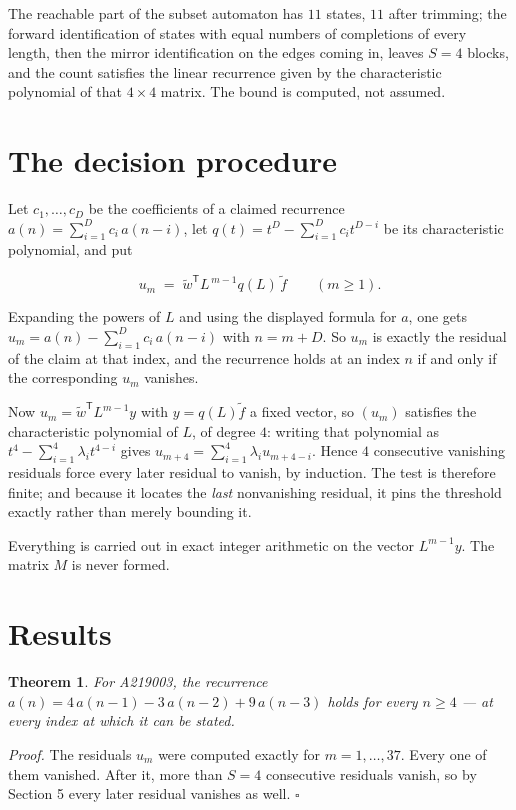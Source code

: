 \documentclass[11pt]{article}
\newtheorem{theorem}{Theorem}
\theoremstyle{definition}
\begin{document}
The reachable part of the subset automaton has $11$ states, $11$ after trimming; the forward identification of states with equal numbers of completions of every length, then the mirror identification on the edges coming in, leaves $S = 4$ blocks, and the count satisfies the linear recurrence given by the characteristic polynomial of that $4\times4$ matrix. The bound is computed, not assumed.

\section{The decision procedure}

Let $c_1,\dots,c_D$ be the coefficients of a claimed recurrence $a(n) = \sum_{i=1}^{D} c_i\,a(n-i)$, let $q(t) = t^{D} - \sum_{i=1}^{D} c_i t^{D-i}$ be its characteristic polynomial, and put

\[u_m \;=\; \tilde w^{\mathsf T} L^{\,m-1} q(L)\,\tilde f \qquad (m \ge 1).\]

Expanding the powers of $L$ and using the displayed formula for $a$, one gets $u_m = a(n) - \sum_{i=1}^{D} c_i\,a(n-i)$ with $n = m + D$. So $u_m$ is exactly the residual of the claim at that index, and the recurrence holds at an index $n$ if and only if the corresponding $u_m$ vanishes.

Now $u_m = \tilde w^{\mathsf T} L^{m-1} y$ with $y = q(L)\tilde f$ a fixed vector, so $(u_m)$ satisfies the characteristic polynomial of $L$, of degree $4$: writing that polynomial as $t^{4} - \sum_{i=1}^{4} \lambda_i t^{4-i}$ gives $u_{m+4} = \sum_{i=1}^{4} \lambda_i u_{m+4-i}$. Hence $4$ consecutive vanishing residuals force every later residual to vanish, by induction. The test is therefore finite; and because it locates the {\itshape last} nonvanishing residual, it pins the threshold exactly rather than merely bounding it.

Everything is carried out in exact integer arithmetic on the vector $L^{m-1}y$. The matrix $M$ is never formed.

\section{Results}

\begin{theorem} For A219003, the recurrence $a(n) = 4\,a(n-1) - 3\,a(n-2) + 9\,a(n-3)$ holds for every $n \ge 4$ --- at every index at which it can be stated.\end{theorem}

{\itshape Proof.} The residuals $u_m$ were computed exactly for $m = 1,\dots,37$. Every one of them vanished. After it, more than $S = 4$ consecutive residuals vanish, so by Section 5 every later residual vanishes as well. $\square$
\end{document}
